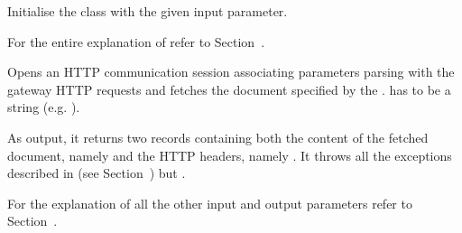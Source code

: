 \documentclass{ozdoc}
\begin{document}
\begin{mozartDESCRIPTION}
\mozartENTRYHASCODE
\begin{mozartSYNOPSIS}
\begin{mozartCODEDISPLAY}\mozartFACETEXT{)}\end{mozartCODEDISPLAY}
\end{mozartSYNOPSIS}
\mozartITEM Initialise the class with the given  input parameter.

  \mozartEMPTY
For the entire explanation of  refer to Section~. \mozartEMPTY
{}\mozartENTRYHASCODE
\begin{mozartSYNOPSIS}
\begin{mozartCODEDISPLAY}\mozartFACETEXT{\mozartSPACE{}}\mozartFACETEXT{\mozartSPACE{}}\mozartFACETEXT{\mozartSPACE{}}\mozartFACETEXT{)}\end{mozartCODEDISPLAY}
\end{mozartSYNOPSIS}
\mozartITEM Opens an HTTP communication session associating  parameters parsing with the gateway  HTTP requests and fetches the document specified by the .  has to be a  string (e.g. ).

As output, it returns two records containing both the content of the fetched document, namely  and the HTTP headers, namely . It throws all the exceptions described in (see Section~) but .

For the explanation of all the other input and output parameters refer to Section~. \mozartEMPTY
\end{mozartDESCRIPTION}


\end{document}
